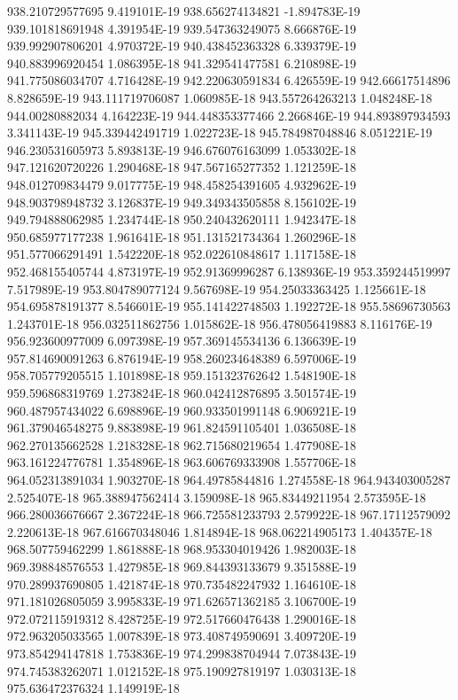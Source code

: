 938.210729577695  9.419101E-19
938.656274134821  -1.894783E-19
939.101818691948  4.391954E-19
939.547363249075  8.666876E-19
939.992907806201  4.970372E-19
940.438452363328  6.339379E-19
940.883996920454  1.086395E-18
941.329541477581  6.210898E-19
941.775086034707  4.716428E-19
942.220630591834  6.426559E-19
942.66617514896  8.828659E-19
943.111719706087  1.060985E-18
943.557264263213  1.048248E-18
944.00280882034  4.164223E-19
944.448353377466  2.266846E-19
944.893897934593  3.341143E-19
945.339442491719  1.022723E-18
945.784987048846  8.051221E-19
946.230531605973  5.893813E-19
946.676076163099  1.053302E-18
947.121620720226  1.290468E-18
947.567165277352  1.121259E-18
948.012709834479  9.017775E-19
948.458254391605  4.932962E-19
948.903798948732  3.126837E-19
949.349343505858  8.156102E-19
949.794888062985  1.234744E-18
950.240432620111  1.942347E-18
950.685977177238  1.961641E-18
951.131521734364  1.260296E-18
951.577066291491  1.542220E-18
952.022610848617  1.117158E-18
952.468155405744  4.873197E-19
952.91369996287  6.138936E-19
953.359244519997  7.517989E-19
953.804789077124  9.567698E-19
954.25033363425  1.125661E-18
954.695878191377  8.546601E-19
955.141422748503  1.192272E-18
955.58696730563  1.243701E-18
956.032511862756  1.015862E-18
956.478056419883  8.116176E-19
956.923600977009  6.097398E-19
957.369145534136  6.136639E-19
957.814690091263  6.876194E-19
958.260234648389  6.597006E-19
958.705779205515  1.101898E-18
959.151323762642  1.548190E-18
959.596868319769  1.273824E-18
960.042412876895  3.501574E-19
960.487957434022  6.698896E-19
960.933501991148  6.906921E-19
961.379046548275  9.883898E-19
961.824591105401  1.036508E-18
962.270135662528  1.218328E-18
962.715680219654  1.477908E-18
963.161224776781  1.354896E-18
963.606769333908  1.557706E-18
964.052313891034  1.903270E-18
964.49785844816  1.274558E-18
964.943403005287  2.525407E-18
965.388947562414  3.159098E-18
965.83449211954  2.573595E-18
966.280036676667  2.367224E-18
966.725581233793  2.579922E-18
967.17112579092  2.220613E-18
967.616670348046  1.814894E-18
968.062214905173  1.404357E-18
968.507759462299  1.861888E-18
968.953304019426  1.982003E-18
969.398848576553  1.427985E-18
969.844393133679  9.351588E-19
970.289937690805  1.421874E-18
970.735482247932  1.164610E-18
971.181026805059  3.995833E-19
971.626571362185  3.106700E-19
972.072115919312  8.428725E-19
972.517660476438  1.290016E-18
972.963205033565  1.007839E-18
973.408749590691  3.409720E-19
973.854294147818  1.753836E-19
974.299838704944  7.073843E-19
974.745383262071  1.012152E-18
975.190927819197  1.030313E-18
975.636472376324  1.149919E-18
